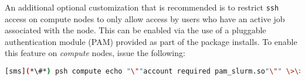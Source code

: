 An additional optional customization that is recommended is to
restrict \texttt{ssh} access on compute nodes to only allow access by users who
have an active job associated with the node. This can be enabled via the use of
a pluggable authentication module (PAM) provided as part of the \SLURM{} package
installs. To enable this feature on {\em compute} nodes, issue the
following:

\begin{lstlisting}[language=bash,keywords={},upquote=true]
[sms](*\#*) psh compute echo "\""account required pam_slurm.so"\"" \>\> /etc/pam.d/sshd
\end{lstlisting}
